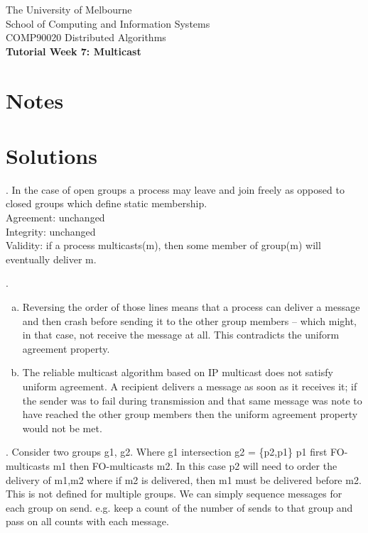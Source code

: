 \documentclass[12pt]{article}
\newcounter{question}
\newcommand{\question}[1]{
    \stepcounter{question}
    \thequestion. #1 \hfill
}
\begin{document}
\begin{center}
    {\sc The University of Melbourne
        \\
        School of Computing and Information Systems
        \\
    COMP90020 Distributed Algorithms}
    \bigskip \\
    {\Large\bf Tutorial Week 7: Multicast}
    \bigskip \\
\end{center}

\section*{Notes}



\section*{Solutions}

\setcounter{question}{29}

\question{In the case of open groups a process may leave and join freely as opposed to closed groups which define static membership.\\

    Agreement: unchanged\\
    Integrity: unchanged\\
    Validity: if a process multicasts(m), then some member of group(m) will eventually deliver m.

}

\question{}

\begin{enumerate}[(a)]
    \item Reversing the order of those lines means that a process can deliver a message and then crash before sending it to the other group members – which might, in that case, not receive the message at all. This contradicts the uniform agreement property.
    \item  The reliable multicast algorithm based on IP multicast does not satisfy uniform agreement. A recipient delivers a message as soon as it receives it; if the sender was to fail during transmission and that same message was note to have reached the other group members then the uniform agreement property would not be met.
\end{enumerate}



\question{Consider two groups g1, g2. Where g1 intersection g2 = \{p2,p1\}
    p1  first FO-multicasts m1 then FO-multicasts m2.
    In this case p2 will need to order the delivery of m1,m2 where  if m2 is delivered, then m1 must be delivered
    before m2.
    This is not defined for multiple groups.
    We can simply sequence messages for each group on send.
    e.g. keep a count of the number of sends to that group and pass on all counts with each message.
}
\end{document}
